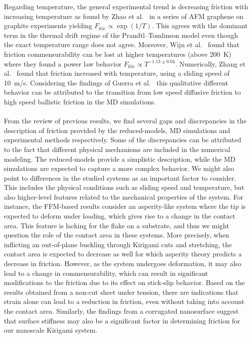 Regarding temperature, the general experimental trend is decreasing friction with increasing temperature as found by Zhao et al.~\cite{zhao_thermally_2007} in a series of \acrshort{AFM} graphene on graphite experiments yielding $F_{\text{fric}} \propto \exp{(1/T)}$. This agrees with the dominant term in the thermal drift regime of the Prandtl–Tomlinson model even though the exact temperature range does not agree. Moreover, Wijn et al.~\cite{Wijn_2011} found that friction commensurability can be lost at higher temperatures (above \SI{200}{K}) where they found a power law behavior $F_{\text{fric}} \propto T^{-1.13 \pm0.04}$. Numerically, Zhang et al.~\cite{ma12091425} found that friction increased with temperature, using a sliding speed of \SI{10}{m/s}. Considering the findings of Guerra et al.~\cite{Guerra_2010} this qualitative different behavior can be attributed to the transition from low speed diffusive friction to high speed ballistic friction in the \acrshort{MD} simulations.
\\
\\
From the review of previous results, we find several gaps and discrepancies in
the description of friction provided by the reduced-models, \acrshort{MD}
simulations and experimental methods respectively. Some of the discrepancies can
be attributed to the fact that different physical mechanisms are included in the 
numerical modeling. The reduced-models provide a simplistic description, while the \acrshort{MD} simulations are expected to capture a more complex behavior. We might also point to differences in the studied systems as an
important factor to consider. This includes the physical conditions such as
sliding speed and temperature, but also higher-level features related to the
mechanical properties of the system. For instance, the \acrshort{FFM}-based
results consider an asperity-like system where the tip is expected to deform
under loading, which gives rise to a change in the contact area. This feature is
lacking for the flake on a substrate, and thus we might question the role of
the contact area in these systems. More precisely, when inflicting an
out-of-plane buckling through Kirigami cuts and stretching, the contact area is
expected to decrease as well for which asperity theory predicts a decrease in friction. However, as the system undergoes deformation, it may also lead to a change in commensurability, which can result in significant modifications to the friction due to its effect on stick-slip behavior. Based on the results obtained from a non-cut sheet under tension, there are indications that strain alone can lead to a reduction in friction, even without taking into account the contact area. Similarly, the findings from a corrugated nanosurface suggest that surface stiffness may also be a significant factor in determining friction for our nanoscale Kirigami system.






